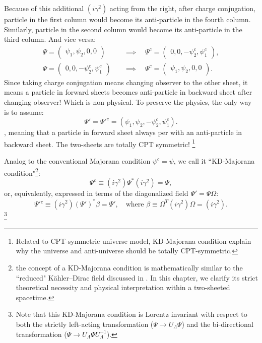 Because of this additional $(i\gamma^2)$ acting from the right, after charge conjugation, particle in the first column would become its anti-particle in the fourth column. Similarly, particle in the second column would become its anti-particle in the third column. And vice versa:
\begin{equation}
\begin{aligned}
    \Psi=\begin{pmatrix} \psi_{1}, \psi_{2},0,0\end{pmatrix}\quad &\implies \quad \Psi^c=\begin{pmatrix} 0,0,-\psi_{2}^{c}, \psi_{1}^{c}\end{pmatrix},\\
    \Psi=\begin{pmatrix} 0,0,-\psi_{2}^{c}, \psi_{1}^{c}\end{pmatrix}\quad &\implies \quad \Psi^c=\begin{pmatrix} \psi_{1}, \psi_{2},0,0\end{pmatrix}.
\end{aligned}
\end{equation}
Since taking charge conjugation means changing observer to the other sheet, it means a particle in forward sheets becomes anti-particle in backward sheet after changing observer! Which is non-physical. To preserve the physics, the only way is to assume:
\begin{equation}\label{eq:KD-Majorana}
  \Psi'=\Psi'^c=(\psi_{1}, \psi_{2}, -\psi_{2}^{c}, \psi_{1}^{c}).
\end{equation}
, meaning that a particle in forward sheet always per with an anti-particle in backward sheet. The two-sheets are totally CPT symmetric! \footnote{Related to CPT-symmetric universe model, KD-Majorana condition explain why the universe and anti-universe should be totally CPT-symmetric.}

Analog to the conventional Majorana condition $\psi^{c}=\psi$, we call it ``KD-Majorana condition"\footnote{the concept of a KD-Majorana condition is mathematically similar to the ``reduced" Kähler–Dirac field discussed in \cite{Butt:2021brl}. In this chapter, we clarify its strict theoretical necessity and physical interpretation within a two-sheeted spacetime.}:
\begin{equation}
  \Psi^{c}\equiv(i\gamma^{2})\Psi^{\ast}(i\gamma^{2})=\Psi,
\end{equation} 
or, equivalently, expressed in terms of the diagonalized field $\Psi'=\Psi\Omega$:
\begin{equation}
  \Psi'{}^{c}\equiv(i\gamma^{2})(\Psi')^{\ast}\beta=\Psi',\quad \text{where } \beta\equiv \Omega^{T}(i\gamma^{2})\Omega=(i\gamma^2).
\end{equation}
\footnote{Note that this KD-Majorana condition is Lorentz invariant with respect to both the strictly left-acting transformation ($\Psi\to U_{\Lambda}\Psi$) and the bi-directional transformation ($\Psi\to U_{\Lambda}\Psi U_{\Lambda}^{-1}$).  }

